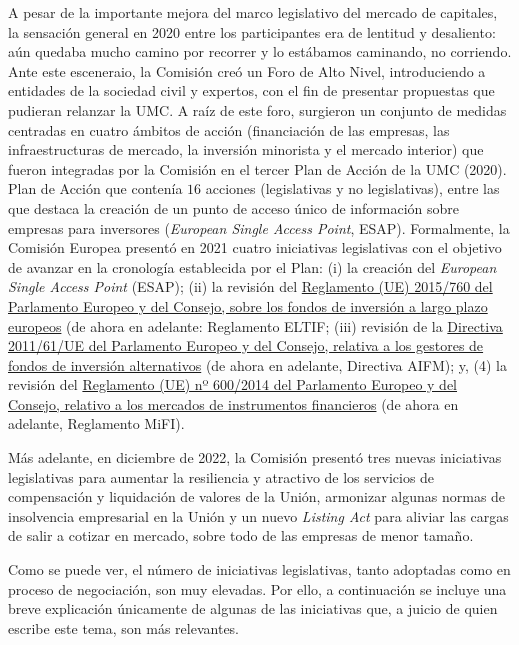 \documentclass[10pt,a4paper]{article}
\begin{document}
{A pesar de la importante mejora del marco legislativo del mercado de capitales, la sensación general en 2020 entre los participantes era de lentitud y desaliento: aún quedaba mucho camino por recorrer y lo estábamos caminando, no corriendo. Ante este esceneraio, la Comisión creó un Foro de Alto Nivel, introduciendo a entidades de la sociedad civil y expertos, con el fin de presentar propuestas que pudieran relanzar la UMC. A raíz de este foro, surgieron un conjunto de medidas centradas en cuatro ámbitos de acción (financiación de las empresas, las infraestructuras de mercado, la inversión minorista y el mercado interior) que fueron integradas por la Comisión en el tercer Plan de Acción de la UMC (2020). Plan de Acción que contenía $16$ acciones (legislativas y no legislativas), entre las que destaca la creación de un punto de acceso único de información sobre empresas para inversores (\textit{European Single Access Point}, ESAP). Formalmente, la Comisión Europea presentó en 2021 cuatro iniciativas legislativas con el objetivo de avanzar en la cronología establecida por el Plan: (i) la creación del \textit{European Single Access Point} (ESAP); (ii) la revisión del \href{https://www.boe.es/buscar/doc.php?id=DOUE-L-2015-80967}{Reglamento (UE) 2015/760 del Parlamento Europeo y del Consejo, sobre los fondos de inversión a largo plazo europeos} (de ahora en adelante: Reglamento ELTIF; (iii) revisión de la \href{https://www.boe.es/doue/2011/174/L00001-00073.pdf}{Directiva 2011/61/UE del Parlamento Europeo y del Consejo, relativa a los gestores de fondos de inversión alternativos} (de ahora en adelante, Directiva AIFM); y, (4) la revisión del \href{https://www.boe.es/doue/2014/173/L00084-00148.pdf}{Reglamento (UE) nº 600/2014 del Parlamento Europeo y del Consejo, relativo a los mercados de instrumentos financieros} (de ahora en adelante, Reglamento MiFI).

Más adelante, en diciembre de 2022, la Comisión presentó tres nuevas iniciativas legislativas para aumentar la resiliencia y atractivo de los servicios de compensación y liquidación de valores de la Unión, armonizar algunas normas de insolvencia empresarial en la Unión y un nuevo \textit{Listing Act} para aliviar las cargas de salir a cotizar en mercado, sobre todo de las empresas de menor tamaño.

Como se puede ver, el número de iniciativas legislativas, tanto adoptadas como en proceso de negociación, son muy elevadas. Por ello, a continuación se incluye una breve explicación únicamente de algunas de las iniciativas que, a juicio de quien escribe este tema, son más relevantes.


}
\end{document}
